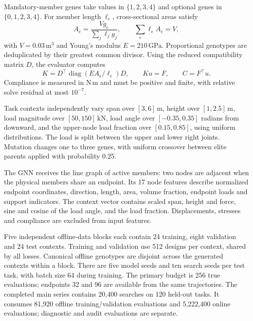\documentclass[11pt,a4paper]{article}
\begin{document}
Mandatory-member genes take values in $\{1,2,3,4\}$ and optional genes in $\{0,1,2,3,4\}$. For member length $\ell_e$, cross-sectional areas satisfy
\begin{equation}
A_e=\frac{Vg_e}{\sum_j\ell_jg_j},\qquad \sum_e\ell_e A_e=V,
\end{equation}
with $V=0.03\,\mathrm{m}^3$ and Young's modulus $E=210\,\mathrm{GPa}$. Proportional genotypes are deduplicated by their greatest common divisor. Using the reduced compatibility matrix $D$, the evaluator computes
\begin{equation}
K=D^\top\operatorname{diag}(EA_e/\ell_e)D,\qquad Ku=F,\qquad C=F^\top u.
\end{equation}
Compliance is measured in $\mathrm{N}\,\mathrm{m}$ and must be positive and finite, with relative solve residual at most $10^{-7}$.

Task contexts independently vary span over $[3,6]\,\mathrm m$, height over $[1,2.5]\,\mathrm m$, load magnitude over $[50,150]\,\mathrm{kN}$, load angle over $[-0.35,0.35]$ radians from downward, and the upper-node load fraction over $[0.15,0.85]$, using uniform distributions. The load is split between the upper and lower right joints. Mutation changes one to three genes, with uniform crossover between elite parents applied with probability 0.25.

The GNN receives the line graph of active members: two nodes are adjacent when the physical members share an endpoint. Its 17 node features describe normalized endpoint coordinates, direction, length, area, volume fraction, endpoint loads and support indicators. The context vector contains scaled span, height and force, sine and cosine of the load angle, and the load fraction. Displacements, stresses and compliance are excluded from input features.

Five independent offline-data blocks each contain 24 training, eight validation and 24 test contexts. Training and validation use 512 designs per context, shared by all losses. Canonical offline genotypes are disjoint across the generated contexts within a block. There are five model seeds and ten search seeds per test task, with batch size 64 during training. The primary budget is 256 true evaluations; endpoints 32 and 96 are available from the same trajectories. The completed main series contains 20,400 searches on 120 held-out tasks. It consumes 81,920 offline training/validation evaluations and 5,222,400 online evaluations; diagnostic and audit evaluations are separate.
\end{document}
